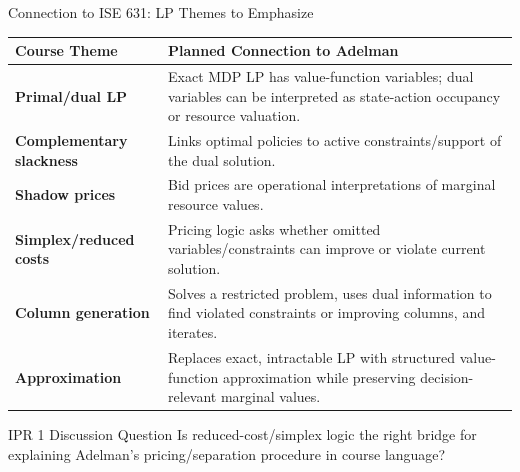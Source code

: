 \documentclass[aspectratio=169,9pt]{beamer}
\begin{document}
\begin{frame}[t]{Connection to ISE 631: LP Themes to Emphasize}
\footnotesize
\begin{tabularx}{\textwidth}{>{\bfseries}p{} X}
\toprule
Course Theme & Planned Connection to Adelman \\
\midrule
Primal/dual LP & Exact MDP LP has value-function variables; dual variables can be interpreted as state-action occupancy or resource valuation. \\
\addlinespace
Complementary slackness & Links optimal policies to active constraints/support of the dual solution. \\
\addlinespace
Shadow prices & Bid prices are operational interpretations of marginal resource values. \\
\addlinespace
Simplex/reduced costs & Pricing logic asks whether omitted variables/constraints can improve or violate current solution. \\
\addlinespace
Column generation & Solves a restricted problem, uses dual information to find violated constraints or improving columns, and iterates. \\
\addlinespace
Approximation & Replaces exact, intractable LP with structured value-function approximation while preserving decision-relevant marginal values. \\
\bottomrule
\end{tabularx}

\vspace{0.4em}
\begin{block}{IPR 1 Discussion Question}
Is reduced-cost/simplex logic the right bridge for explaining Adelman's pricing/separation procedure in course language?
\end{block}
\end{frame}
\end{document}
